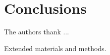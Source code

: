 \documentclass[journal=ancac3, manuscript=article, etalmode=truncate,maxauthors=0]{achemso}
\begin{document}
\section{Conclusions}\label{sect:conclusions}

\begin{acknowledgement}
The authors thank ...
\end{acknowledgement}


\begin{suppinfo}
	Extended materials and methods.
\end{suppinfo}


\newpage %


\newpage







%
\end{document}

